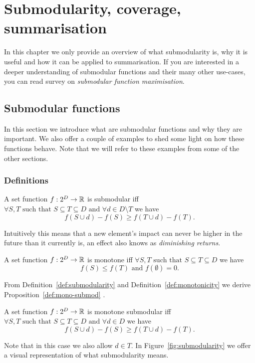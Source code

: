 \chapter{Submodularity, coverage, summarisation}
\label{cap:submodularity}

In this chapter we only provide an overview of what submodularity is, why it is
useful and how it can be applied to summarisation. If you are interested in a
deeper understanding of submodular functions and their many other use-cases,
you can read survey \cite{krause2012submodular} on \emph{submodular function
maximisation}.

\section{Submodular functions}
\label{sec:submod-functions}

In this section we introduce what are submodular functions and why they are
important. We also offer a couple of examples to shed some light on how these
functions behave. Note that we will refer to these examples from some of the
other sections.

\subsection{Definitions}

\begin{definition}[Submodularity]
  \label{def:submodularity}
  A set function \(f : 2^D \to \mathbb{R}\) is submodular iff
  \(\forall S, T \text{ such that } S \subseteq T \subseteq D
    \text{ and } \forall d \in D \setminus T\) we have
  \[f(S \cup {d}) - f(S) \geq f(T \cup {d}) - f(T).\]
\end{definition}
Intuitively this means that a new element's impact can never be higher in the
future than it currently is, an effect also knows as \emph{diminishing returns}.

\begin{definition}[Monotonicity]
  \label{def:monotonicity}
  A set function \(f : 2^D \to \mathbb{R}\) is monotone iff
  \(\forall S, T \text{ such that } S \subseteq T \subseteq D\) we have
  \[f(S) \leq f(T) \text{ and } f(\emptyset) = 0.\]
\end{definition}

From Definition~\ref{def:submodularity} and Definition~\ref{def:monotonicity}
we derive Proposition~\ref{def:mono-submod} \cite{nemhauser1978analysis}.
\begin{proposition}
  \label{def:mono-submod}
  A set function \(f : 2^D \to \mathbb{R}\) is monotone submodular iff
  \(\forall S, T \text{ such that } S \subseteq T \subseteq D
    \text{ and } \forall d \in D\) we have
  \[f(S \cup {d}) - f(S) \geq f(T \cup {d}) - f(T).\]
\end{proposition}
Note that in this case we also allow \(d \in T\).
In Figure~\ref{fig:submodularity} we offer a visual representation of what
submodularity means.

